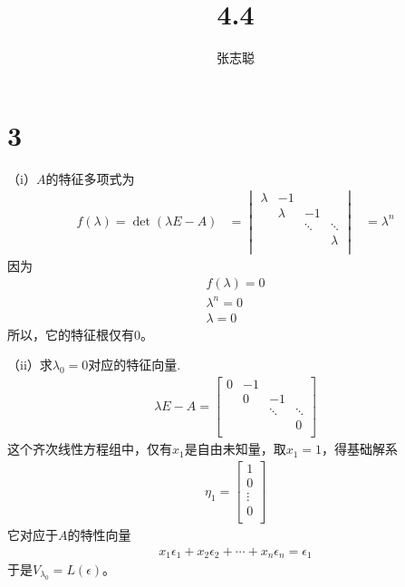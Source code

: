 \documentclass{article}
\begin{document}
\title{4.4}
\author{张志聪}
\maketitle

\section*{3}

（i）$A$的特征多项式为
\begin{align*}
  f(\lambda) = \det(\lambda E - A)
   & = \begin{vmatrix}
         \lambda & -1      &        &         \\
                 & \lambda & -1     &         \\
                 &         & \ddots & \ddots  \\
                 &         &        & \lambda \\
       \end{vmatrix}
   & = \lambda^n
\end{align*}
因为
\begin{align*}
  f(\lambda) = 0 \\
  \lambda^n = 0  \\
  \lambda = 0
\end{align*}
所以，它的特征根仅有0。

（ii）求$\lambda_0 = 0$对应的特征向量.
\begin{align*}
  \lambda E - A = \begin{bmatrix}
                    0 & -1 &        &        \\
                      & 0  & -1     &        \\
                      &    & \ddots & \ddots \\
                      &    &        & 0      \\
                  \end{bmatrix}
\end{align*}
这个齐次线性方程组中，仅有$x_1$是自由未知量，取$x_1 = 1$，得基础解系
\begin{align*}
  \eta_1 = \begin{bmatrix}
             1      \\
             0      \\
             \vdots \\
             0      \\
           \end{bmatrix}
\end{align*}
它对应于$A$的特性向量
\begin{align*}
  x_1 \epsilon_1 + x_2 \epsilon_2 + \cdots + x_n \epsilon_n = \epsilon_1
\end{align*}
于是$V_{\lambda_0} = L(\epsilon)$。
\end{document}
